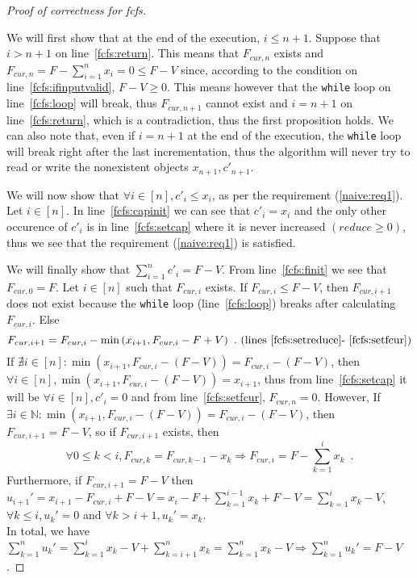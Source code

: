 \begin{proof}[Proof of correctness for fcfs] \

   We will first show that at the end of the execution, $i \leq n+1$. Suppose that $i > n+1$ on line~\ref{fcfs:return}. This
   means that $F_{cur,n}$ exists and $F_{cur,n} = F - \sum\limits_{i=1}^{n}x_i = 0 \leq F - V$ since, according to the
   condition on line~\ref{fcfs:ifinputvalid}, $F - V \geq 0$. This means however that the \texttt{while} loop on
   line~\ref{fcfs:loop} will break, thus $F_{cur,n+1}$ cannot exist and $i = n + 1$ on line~\ref{fcfs:return}, which is a
   contradiction, thus the first proposition holds. We can also note that, even if $i = n + 1$ at the end of the execution,
   the \texttt{while} loop will break right after the last incrementation, thus the algorithm will never try to read or
   write the nonexistent objects $x_{n+1}, c'_{n+1}$.

   We will now show that $\forall i \in [n], c'_i \leq x_i$, as per the requirement (\ref{naive:req1}). Let $i \in [n]$.
   In line~\ref{fcfs:capinit} we can see that $c'_i = x_i$ and the only other occurence of $c'_i$ is in
   line~\ref{fcfs:setcap} where it is never increased $(reduce \geq 0)$, thus we see that the requirement (\ref{naive:req1})
   is satisfied.

   We will finally show that $\sum\limits_{i=1}^{n}c'_i = F - V$. From line~\ref{fcfs:finit} we see that $F_{cur,0} = F$.
   Let $i \in [n]$ such that $F_{cur, i}$ exists. If $F_{cur, i} \leq F - V$, then $F_{cur,i+1}$ does not exist because the
   \texttt{while} loop (line~\ref{fcfs:loop}) breaks after calculating $F_{cur,i}$. Else
   \begin{equation*}
      F_{cur,i+1} = F_{cur,i} - \min{(x_{i+1}, F_{cur,i} - F + V)} \enspace.
      \mbox{ (lines~\ref{fcfs:setreduce}-~\ref{fcfs:setfcur})}
   \end{equation*}
   If $\nexists i \in [n]: \min{\left(x_{i+1}, F_{cur, i} - \left(F - V\right)\right)} = F_{cur,i} - \left(F - V\right)$,
   then $\forall i \in [n], \min{\left(x_{i+1}, F_{cur, i} - \left(F - V\right)\right)} = x_{i+1}$, thus
   from line~\ref{fcfs:setcap} it will be $\forall i \in [n], c'_i = 0$ and from line~\ref{fcfs:setfcur}, $F_{cur, n} = 0$.
   However, 
   If $\exists i \in \mathbb{N}: \min{\left(x_{i+1}, F_{cur, i} - \left(F - V\right)\right)} = F_{cur,i} - \left(F - V\right)$, then
   $F_{cur,i+1} = F - V$, so if $F_{cur,i+1}$ exists, then
   \begin{equation*}
      \forall 0 \leq k < i, F_{cur,k} = F_{cur,k-1} - x_k \Rightarrow F_{cur,i} = F - \sum\limits_{k=1}^{i}x_k \enspace.
   \end{equation*}
   Furthermore, if $F_{cur,i+1} = F - V$ then $u_{i+1}' = x_{i+1} - F_{cur,i} + F - V =
   x_i - F + \sum\limits_{k=1}^{i-1}x_k + F - V = \sum\limits_{k=1}^{i}x_k - V$, $\forall k \leq i, u_k' = 0$
   and $\forall k > i+1, u_k' = x_k$. \\
   In total, we have $\sum\limits_{k=1}^{n}u_k' = \sum\limits_{k=1}^{i}x_k - V + \sum\limits_{k=i+1}^{n}x_k =
   \sum\limits_{k=1}^{n}x_k - V \Rightarrow \sum\limits_{k=1}^{n}u_k' = F - V$.
\end{proof}
